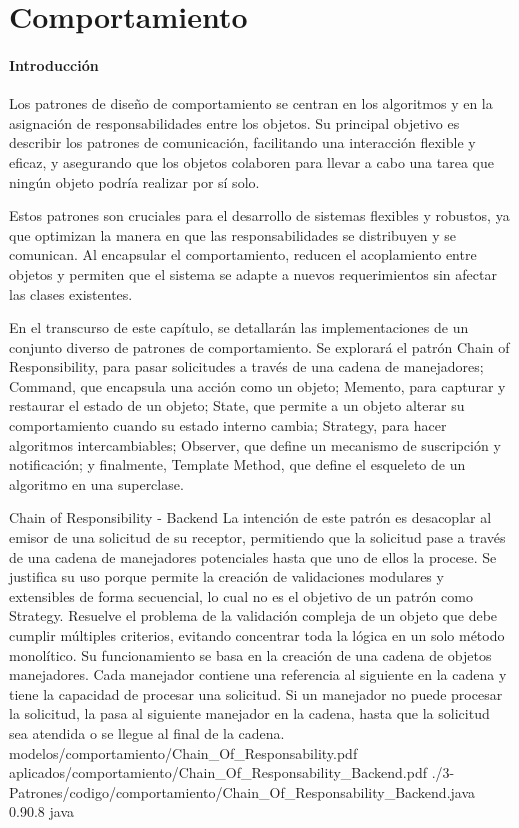 \chapter{Comportamiento}
\subsubsection{Introducción}{
    Los patrones de diseño de comportamiento se centran en los algoritmos y en la asignación de responsabilidades entre los objetos. Su principal objetivo es describir los patrones de comunicación, facilitando una interacción flexible y eficaz, y asegurando que los objetos colaboren para llevar a cabo una tarea que ningún objeto podría realizar por sí solo.

    Estos patrones son cruciales para el desarrollo de sistemas flexibles y robustos, ya que optimizan la manera en que las responsabilidades se distribuyen y se comunican. Al encapsular el comportamiento, reducen el acoplamiento entre objetos y permiten que el sistema se adapte a nuevos requerimientos sin afectar las clases existentes.

    En el transcurso de este capítulo, se detallarán las implementaciones de un conjunto diverso de patrones de comportamiento. Se explorará el patrón Chain of Responsibility, para pasar solicitudes a través de una cadena de manejadores; Command, que encapsula una acción como un objeto; Memento, para capturar y restaurar el estado de un objeto; State, que permite a un objeto alterar su comportamiento cuando su estado interno cambia; Strategy, para hacer algoritmos intercambiables; Observer, que define un mecanismo de suscripción y notificación; y finalmente, Template Method, que define el esqueleto de un algoritmo en una superclase.
}

\Patron
    {Chain of Responsibility - Backend}
    {La intención de este patrón es desacoplar al emisor de una solicitud de su receptor, permitiendo que la solicitud pase a través de una cadena de manejadores potenciales hasta que uno de ellos la procese. Se justifica su uso porque permite la creación de validaciones modulares y extensibles de forma secuencial, lo cual no es el objetivo de un patrón como Strategy.}
    {Resuelve el problema de la validación compleja de un objeto que debe cumplir múltiples criterios, evitando concentrar toda la lógica en un solo método monolítico. Su funcionamiento se basa en la creación de una cadena de objetos manejadores. Cada manejador contiene una referencia al siguiente en la cadena y tiene la capacidad de procesar una solicitud. Si un manejador no puede procesar la solicitud, la pasa al siguiente manejador en la cadena, hasta que la solicitud sea atendida o se llegue al final de la cadena.}
    {modelos/comportamiento/Chain_Of_Responsability.pdf}
    {aplicados/comportamiento/Chain_Of_Responsability_Backend.pdf}
    {./3-Patrones/codigo/comportamiento/Chain_Of_Responsability_Backend.java}
    {0.9}{0.8}
    {java}
\newpage

